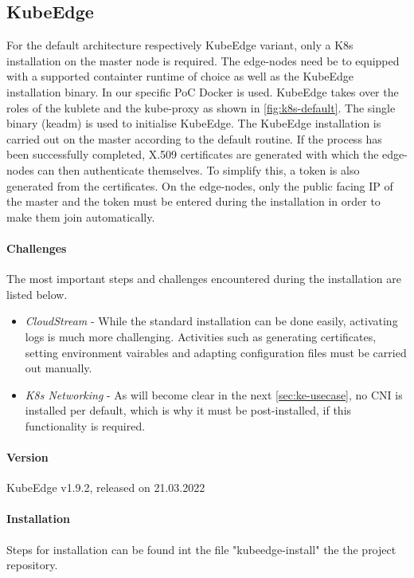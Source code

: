 \documentclass[MSC,Master,english]{twbook}%
\begin{document}
\subsection{KubeEdge}
\label{sec:dsrenvke}
For the default architecture respectively KubeEdge variant, only a \ac{K8s} installation on the master node is required. The edge-nodes need be to equipped with a supported containter runtime of choice as well as the KubeEdge installation binary. In our specific \ac{PoC} Docker is used. KubeEdge takes over the roles of the kublete and the kube-proxy as shown in \autoref{fig:k8s-default}. The single binary (keadm) is used to initialise KubeEdge. The KubeEdge installation is carried out on the master according to the default routine. If the process has been successfully completed, X.509 certificates are generated with which the edge-nodes can then authenticate themselves. To simplify this, a token is also generated from the certificates. On the edge-nodes, only the public facing \ac{IP} of the master and the token must be entered during the installation in order to make them join automatically.

\paragraph{Challenges} The most important steps and challenges encountered during the installation are listed below.

\begin{itemize}
    \item \textit{CloudStream} - While the standard installation can be done easily, activating logs is much more challenging. Activities such as generating certificates, setting environment vairables and adapting configuration files must be carried out manually.
    \item \textit{K8s Networking} - As will become clear in the next \autoref{sec:ke-usecase}, no \ac{CNI} is installed per default, which is why it must be post-installed, if this functionality is required. 
\end{itemize}

\paragraph{Version} KubeEdge v1.9.2, released on 21.03.2022

\paragraph{Installation} Steps for installation can be found int the file "kubeedge-install"\cite{bk-gh-ke-install} the the project repository.
\end{document}
